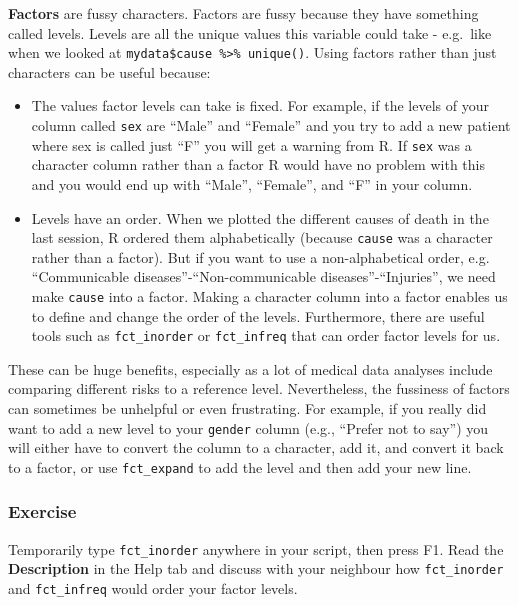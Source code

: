 \documentclass[]{book}
\providecommand{\tightlist}{%
  \setlength{\itemsep}{0pt}\setlength{\parskip}{0pt}}
\theoremstyle{definition}
\theoremstyle{definition}
\theoremstyle{definition}
\theoremstyle{remark}
\begin{document}
\textbf{Factors} are fussy characters. Factors are fussy because they
have something called levels. Levels are all the unique values this
variable could take - e.g.~like when we looked at
\texttt{mydata\$cause\ \%\textgreater{}\%\ unique()}. Using factors
rather than just characters can be useful because:

\begin{itemize}
\tightlist
\item
  The values factor levels can take is fixed. For example, if the levels
  of your column called \texttt{sex} are ``Male'' and ``Female'' and you
  try to add a new patient where sex is called just ``F'' you will get a
  warning from R. If \texttt{sex} was a character column rather than a
  factor R would have no problem with this and you would end up with
  ``Male'', ``Female'', and ``F'' in your column.
\item
  Levels have an order. When we plotted the different causes of death in
  the last session, R ordered them alphabetically (because
  \texttt{cause} was a character rather than a factor). But if you want
  to use a non-alphabetical order, e.g. ``Communicable
  diseases''-``Non-communicable diseases''-``Injuries'', we need make
  \texttt{cause} into a factor. Making a character column into a factor
  enables us to define and change the order of the levels. Furthermore,
  there are useful tools such as \texttt{fct\_inorder} or
  \texttt{fct\_infreq} that can order factor levels for us.
\end{itemize}

These can be huge benefits, especially as a lot of medical data analyses
include comparing different risks to a reference level. Nevertheless,
the fussiness of factors can sometimes be unhelpful or even frustrating.
For example, if you really did want to add a new level to your
\texttt{gender} column (e.g., ``Prefer not to say'') you will either
have to convert the column to a character, add it, and convert it back
to a factor, or use \texttt{fct\_expand} to add the level and then add
your new line.

\subsubsection{Exercise}\label{exercise-8}

Temporarily type \texttt{fct\_inorder} anywhere in your script, then
press F1. Read the \textbf{Description} in the Help tab and discuss with
your neighbour how \texttt{fct\_inorder} and \texttt{fct\_infreq} would
order your factor levels.
\end{document}
